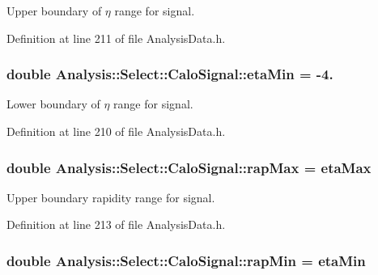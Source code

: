 Upper boundary of $ \eta $ range for signal. 



Definition at line 211 of file Analysis\+Data.\+h.

\subsubsection[{\texorpdfstring{eta\+Min}{etaMin}}]{\setlength{\rightskip}{0pt plus 5cm}double Analysis\+::\+Select\+::\+Calo\+Signal\+::eta\+Min = -\/4.\hspace{0.3cm}{\ttfamily [static]}}\hypertarget{namespaceAnalysis_1_1Select_1_1CaloSignal_af20c529b123696be2ab71aaa25906edb}{}\label{namespaceAnalysis_1_1Select_1_1CaloSignal_af20c529b123696be2ab71aaa25906edb}


Lower boundary of $ \eta $ range for signal. 



Definition at line 210 of file Analysis\+Data.\+h.

\subsubsection[{\texorpdfstring{rap\+Max}{rapMax}}]{\setlength{\rightskip}{0pt plus 5cm}double Analysis\+::\+Select\+::\+Calo\+Signal\+::rap\+Max = {\bf eta\+Max}\hspace{0.3cm}{\ttfamily [static]}}\hypertarget{namespaceAnalysis_1_1Select_1_1CaloSignal_a358398a6fbba8bcfd3f534ccbf838aa8}{}\label{namespaceAnalysis_1_1Select_1_1CaloSignal_a358398a6fbba8bcfd3f534ccbf838aa8}


Upper boundary rapidity range for signal. 



Definition at line 213 of file Analysis\+Data.\+h.

\subsubsection[{\texorpdfstring{rap\+Min}{rapMin}}]{\setlength{\rightskip}{0pt plus 5cm}double Analysis\+::\+Select\+::\+Calo\+Signal\+::rap\+Min = {\bf eta\+Min}\hspace{0.3cm}{\ttfamily [static]}}\hypertarget{namespaceAnalysis_1_1Select_1_1CaloSignal_aa11187307efce66323ce38d6afdd75d7}{}\label{namespaceAnalysis_1_1Select_1_1CaloSignal_aa11187307efce66323ce38d6afdd75d7}


